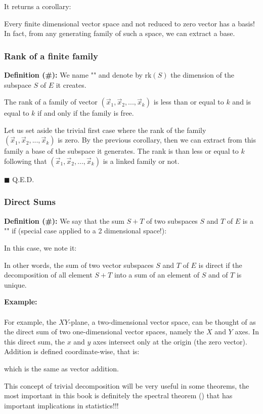 	It returns a corollary: 

	Every finite dimensional vector space and not reduced to zero vector has a basis! In fact, from any generating family of such a space, we can extract a base.
	
	\subsubsection{Rank of a finite family}
	\textbf{Definition (\#\mydef):} We name "" and denote by $\text{rk}(S)$ the dimension of the subspace $S$ of $E$ it creates.
	
	\begin{theorem}
	The rank of a family of vector $(\vec{x}_1,\vec{x}_2,...,\vec{x}_k)$ is less than or equal to $k$ and is equal to $k$ if and only if the family is free.
	\end{theorem}
	\begin{dem}
	Let us set aside the trivial first case where the rank of the family $(\vec{x}_1,\vec{x}_2,...,\vec{x}_k)$ is zero. By the previous corollary, then we can extract from this family a base of the subspace it generates. The rank is than less or equal to $k$ following that $(\vec{x}_1,\vec{x}_2,...,\vec{x}_k)$ is a linked family or not.
	\begin{flushright}
		$\blacksquare$  Q.E.D.
	\end{flushright}
	\end{dem}
	
	\pagebreak
	\subsubsection{Direct Sums}
	\textbf{Definition (\#\mydef):} We say that the sum $S + T$ of two subspaces $S$ and $T$ of $E$ is a "\label{direct sum}" if (special case applied to a 2 dimensional space!):
	
	In this case, we note it:
	
	In other words, the sum of two vector subspaces $S$ and $T$ of $E$ is direct if the decomposition of all element $S + T$ into a sum of an element of $S$ and of $T$  is unique.
	
	\begin{tcolorbox}[colframe=black,colback=white,sharp corners]
	\textbf{{\Large {}}Example:}\\\\
	For example, the $XY$-plane, a two-dimensional vector space, can be thought of as the direct sum of two one-dimensional vector spaces, namely the $X$ and $Y$ axes. In this direct sum, the $x$ and $y$ axes intersect only at the origin (the zero vector). Addition is defined coordinate-wise, that is:
	 
	which is the same as vector addition.
	\end{tcolorbox}	
	This concept of trivial decomposition will be very useful in some theorems, the most important in this book is definitely the spectral theorem () that has important implications in statistics!!!
	
